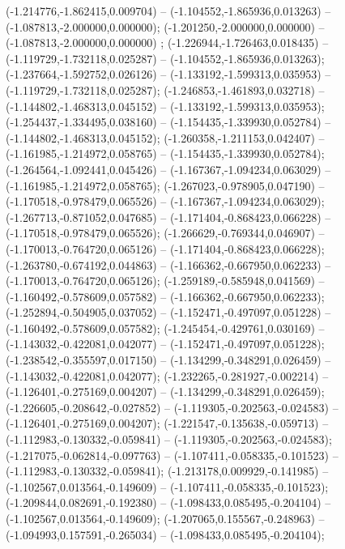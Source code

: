  (-1.214776,-1.862415,0.009704) -- (-1.104552,-1.865936,0.013263) -- (-1.087813,-2.000000,0.000000);
 (-1.201250,-2.000000,0.000000) -- (-1.087813,-2.000000,0.000000) ;
 (-1.226944,-1.726463,0.018435) -- (-1.119729,-1.732118,0.025287) -- (-1.104552,-1.865936,0.013263);
 (-1.237664,-1.592752,0.026126) -- (-1.133192,-1.599313,0.035953) -- (-1.119729,-1.732118,0.025287);
 (-1.246853,-1.461893,0.032718) -- (-1.144802,-1.468313,0.045152) -- (-1.133192,-1.599313,0.035953);
 (-1.254437,-1.334495,0.038160) -- (-1.154435,-1.339930,0.052784) -- (-1.144802,-1.468313,0.045152);
 (-1.260358,-1.211153,0.042407) -- (-1.161985,-1.214972,0.058765) -- (-1.154435,-1.339930,0.052784);
 (-1.264564,-1.092441,0.045426) -- (-1.167367,-1.094234,0.063029) -- (-1.161985,-1.214972,0.058765);
 (-1.267023,-0.978905,0.047190) -- (-1.170518,-0.978479,0.065526) -- (-1.167367,-1.094234,0.063029);
 (-1.267713,-0.871052,0.047685) -- (-1.171404,-0.868423,0.066228) -- (-1.170518,-0.978479,0.065526);
 (-1.266629,-0.769344,0.046907) -- (-1.170013,-0.764720,0.065126) -- (-1.171404,-0.868423,0.066228);
 (-1.263780,-0.674192,0.044863) -- (-1.166362,-0.667950,0.062233) -- (-1.170013,-0.764720,0.065126);
 (-1.259189,-0.585948,0.041569) -- (-1.160492,-0.578609,0.057582) -- (-1.166362,-0.667950,0.062233);
 (-1.252894,-0.504905,0.037052) -- (-1.152471,-0.497097,0.051228) -- (-1.160492,-0.578609,0.057582);
 (-1.245454,-0.429761,0.030169) -- (-1.143032,-0.422081,0.042077) -- (-1.152471,-0.497097,0.051228);
 (-1.238542,-0.355597,0.017150) -- (-1.134299,-0.348291,0.026459) -- (-1.143032,-0.422081,0.042077);
 (-1.232265,-0.281927,-0.002214) -- (-1.126401,-0.275169,0.004207) -- (-1.134299,-0.348291,0.026459);
 (-1.226605,-0.208642,-0.027852) -- (-1.119305,-0.202563,-0.024583) -- (-1.126401,-0.275169,0.004207);
 (-1.221547,-0.135638,-0.059713) -- (-1.112983,-0.130332,-0.059841) -- (-1.119305,-0.202563,-0.024583);
 (-1.217075,-0.062814,-0.097763) -- (-1.107411,-0.058335,-0.101523) -- (-1.112983,-0.130332,-0.059841);
 (-1.213178,0.009929,-0.141985) -- (-1.102567,0.013564,-0.149609) -- (-1.107411,-0.058335,-0.101523);
 (-1.209844,0.082691,-0.192380) -- (-1.098433,0.085495,-0.204104) -- (-1.102567,0.013564,-0.149609);
 (-1.207065,0.155567,-0.248963) -- (-1.094993,0.157591,-0.265034) -- (-1.098433,0.085495,-0.204104);
